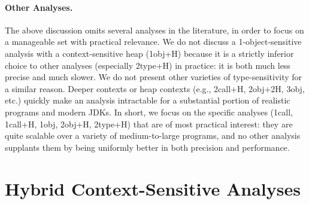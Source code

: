 

\paragraph{Other Analyses.} The above discussion omits several analyses
in the literature, in order to focus on a manageable set with
practical relevance. We do not discuss a 1-object-sensitive analysis
with a context-sensitive heap (1obj+H) because it is a strictly
inferior choice to other analyses (especially 2type+H) in practice: it
is both much less precise and much slower. We do not present other
varieties of type-sensitivity for a similar reason. Deeper contexts or
heap contexts (e.g., 2call+H, 2obj+2H, 3obj, etc.) quickly make an
analysis intractable for a substantial portion of realistic programs
and modern JDKs. In short, we focus on the specific analyses (1call,
1call+H, 1obj, 2obj+H, 2type+H) that are of most practical interest:
they are quite scalable over a variety of medium-to-large programs,
and no other analysis supplants them by being uniformly better in both
precision and performance.



\section{Hybrid Context-Sensitive Analyses}
\label{sec:hybrid}

